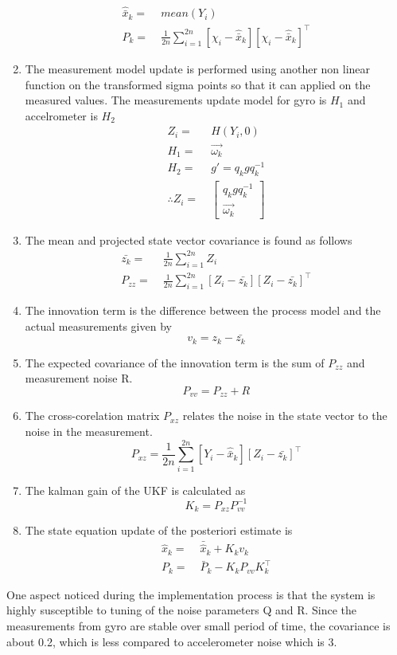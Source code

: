 \documentclass[fleqn,10pt]{SelfArx} %
\begin{document}
\begin{enumerate}
\begin{align*}
\hat{\bar{x}}_k =&\; mean(Y_i) \\
P_k =&\; \frac{1}{2n}\sum_{i=1}^{2n}[\chi_i - \hat{\bar{x}}_k][\chi_i - \hat{\bar{x}}_k]^\top
\end{align*}
\item The measurement model update is performed using another non linear function on the transformed sigma points so that it can applied on the measured values. The measurements update model for gyro is $H_1$ and accelrometer is $H_2$
\begin{align*}
Z_i =&\; H(Y_i,0) \\
H_1 =&\; \vec{\omega_k} \\
H_2 =&\; g' = q_kgq_k^{-1} \\
\therefore Z_i =&\; \begin{bmatrix}
q_kgq_k^{-1} \\
\vec{\omega_k}
\end{bmatrix}
\end{align*}
\item The mean and projected state vector covariance is found as follows
\begin{align*}
\bar{z_k} =&\; \frac{1}{2n}\sum_{i=1}^{2n} Z_i \\
P_{zz} =&\; \frac{1}{2n}\sum_{i=1}^{2n}[Z_i-\bar{z_k}][Z_i-\bar{z_k}]^\top
\end{align*}
\item The innovation term is the difference between the process model and the actual measurements given by
\[
v_k = z_k - \bar{z_k}
\]
\item The expected covariance of the innovation term is the sum of $P_{zz}$ and measurement noise R.
\[
P_{vv} = P_{zz} +  R
\]
\item The cross-corelation matrix $P_{xz}$ relates the noise in the state vector to the noise in the measurement.
\[
P_{xz} = \frac{1}{2n}\sum_{i=1}^{2n}[Y_i-\hat{\bar{x}}_k][Z_i-\bar{z_k}]^\top
\]
\item The kalman gain of the UKF is calculated as
\[
K_k = P_{xz}P^{-1}_{vv}
\]
\item The state equation update of the posteriori estimate is
\begin{align*}
\hat{x}_k =&\; \bar{\hat{x}}_k + K_kv_k \\
P_k =&\; \bar{P}_k - K_kP_{vv}K_k^\top
\end{align*}
\end{enumerate}
One aspect noticed during the implementation process is that the system is highly susceptible to tuning of the noise parameters Q and R. Since the measurements from gyro are stable over small period of time, the covariance is about 0.2, which is less compared to accelerometer noise which is 3.
\end{document}
